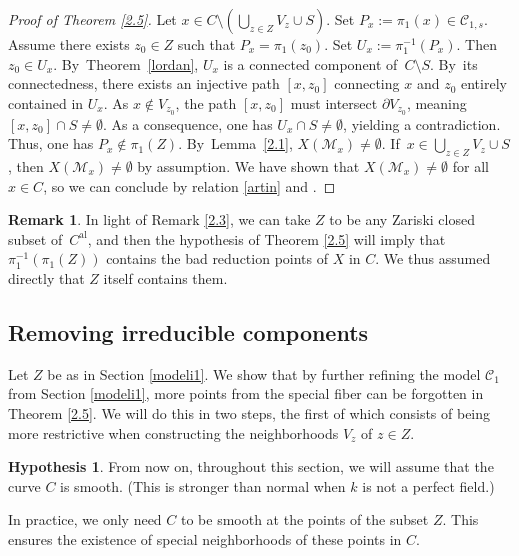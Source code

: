 \documentclass[JEP,XML,SOM,Unicode,NoFloatCountersInSection,published]{cedram}
\newcommand{\al}{\mathrm{al}}
\let\backslash\setminus
\theoremstyle{definition}
\newtheorem{rem}[thm]{Remark}
\newtheorem{cond}[thm]{Hypothesis}
\begin{document}
\begin{proof}[Proof of Theorem \ref{2.5}]
Let ${x \in C \backslash (\bigcup_{z \in Z} V_z \cup S)}$. Set ${P_x:=\pi_1(x) \in \mathscr{C}_{1,s}}$. Assume there exists $z_0 \in Z$ such that $P_x=\pi_1(z_0)$. Set $U_x:=\pi_1^{-1}(P_x)$. Then $z_0 \in U_x$. By~Theorem~\ref{lordan}, $U_x$ is a connected component of~$C \backslash S$. By~its connectedness, there exists an injective path $[x, z_0]$ connecting $x$ and $z_0$ entirely contained in $U_x$. As $x \not \in V_{z_0}$, the path $[x,z_0]$ must intersect $\partial{V_{z_0}}$, meaning $[x, z_0] \cap S \neq \emptyset$. As a consequence, one has $U_x \cap S \neq \emptyset$, yielding a contradiction. Thus, one has $P_x \not \in \pi_1(Z)$. By~Lemma~\ref{2.1}, $X(\mathscr{M}_x) \neq \emptyset$. If~$x \in \bigcup_{z \in Z} V_z \cup S$, then $X(\mathscr{M}_x) \neq \emptyset$ by assumption. We have shown that $X(\mathscr{M}_x) \neq \emptyset$ for all $x \in C$, so we can conclude by relation \eqref{artin} and \cite[Cor.\,3.18]{une}.
\end{proof}

\begin{rem} \label{2.7}
In light of Remark \ref{2.3}, we can take $Z$ to be any Zariski closed subset of~$C^{\al}$, and then the hypothesis of Theorem \ref{2.5} will imply that $\pi_1^{-1}(\pi_1(Z))$ contains the bad reduction points of $X$ in $C$. We thus assumed directly that $Z$ itself contains them.\enlargethispage{.5\baselineskip}%
\end{rem}

\subsection{Removing irreducible components} \label{modeli2} Let $Z$ be as in Section \ref{modeli1}.
We show that by further refining the model $\mathscr{C}_1$ from Section \ref{modeli1}, more points from the special fiber can be forgotten in Theorem \ref{2.5}. We will do this in two steps, the first of which consists of being more restrictive when constructing the neighborhoods $V_z$ of $z \in Z$.

\begin{cond}\label{2.8}
From now on, throughout this section, we will assume that the curve $C$ is smooth. (This is stronger than normal when $k$ is not a perfect field.)
\end{cond}

In practice, we only need $C$ to be smooth at the points of the subset $Z$. This ensures the existence of special neighborhoods of these points in $C$.
\end{document}
